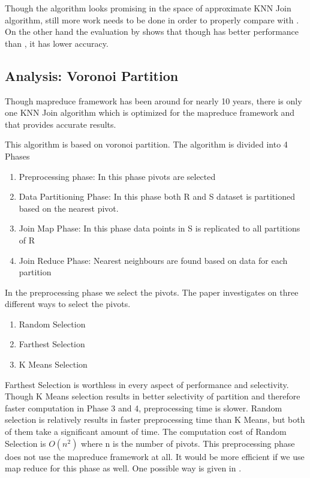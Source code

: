 \documentclass[conference]{IEEEtran}
\begin{document}
Though the algorithm looks promising in the space of approximate KNN
Join algorithm, still more work needs to be done in order to properly
compare with \cite{zhang_efficient_2012}. On the other hand the
evaluation by \cite{song_solutions_2015} shows that though
\cite{zhang_efficient_2012} has better performance than
\cite{stupar_rankreduceprocessing_2010}, it has lower accuracy.
\bigskip
\subsection{Analysis: Voronoi Partition}
Though mapreduce framework has been around for nearly 10 years, there
is only one KNN Join algorithm \cite{lu_efficient_2012} which is
optimized for the mapreduce framework and that provides accurate
results.

This algorithm is based on voronoi partition. The algorithm is
divided into 4 Phases
\begin{enumerate}
\item Preprocessing phase: In this phase pivots are selected
\item Data Partitioning Phase: In this phase both R and S dataset is
  partitioned based on the nearest pivot.
\item Join Map Phase: In this phase data points in S is replicated to
  all partitions of R
\item Join Reduce Phase: Nearest neighbours are found based on data
  for each partition
\end{enumerate}

\bigskip

In the preprocessing phase we select the pivots. The paper
investigates on three different ways to select the pivots.
\begin{enumerate}
\item Random Selection
\item Farthest Selection
\item K Means Selection
\end{enumerate}

Farthest Selection is worthless in every aspect of performance and
selectivity. Though K Means selection results in better selectivity of partition
and therefore faster computation in Phase 3 and 4, preprocessing time
is slower. Random selection is relatively results in faster
preprocessing time than K Means, but both of them take a significant
amount of time. The computation cost of Random Selection is $O(n^2)$
where n is the number of pivots. This preprocessing phase does not use the
mapreduce framework at all. It would be more efficient if we use map
reduce for this phase as well. One possible way is given in
\cite{kiefer_pairwise_2010}.
\end{document}
